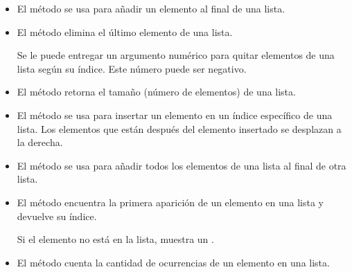 \begin{itemize}
  \item El método  se usa para añadir un elemento al final de una lista.
  

  \item El método  elimina el último elemento de una lista.
  

  Se le puede entregar un argumento numérico para quitar elementos de una lista según su índice. Este número puede ser negativo.


  \item El método  retorna el tamaño (número de elementos) de una lista.
  

  \item El método  se usa para insertar un elemento en un índice específico de una lista. Los elementos que están después del elemento insertado se desplazan a la derecha.


  \item El método  se usa para añadir todos los elementos de una lista al final de otra lista.
  

  \item El método  encuentra la primera aparición de un elemento en una lista y devuelve su índice.
  

  Si el elemento no está en la lista, muestra un .


  \item El método  cuenta la cantidad de ocurrencias de un elemento en una lista.
  


\end{itemize}
